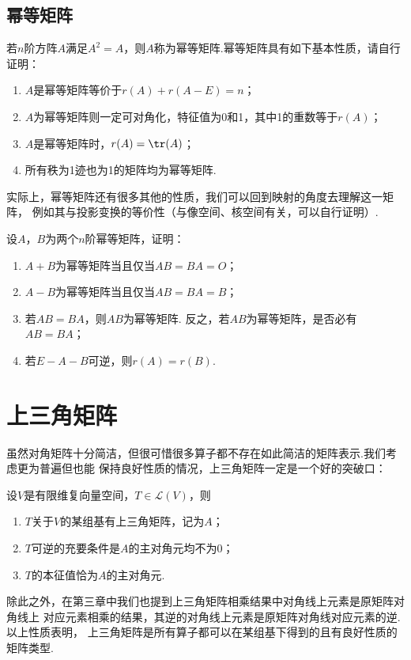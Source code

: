 \subsection{幂等矩阵}
若$n$阶方阵$A$满足$A^2=A$，则$A$称为幂等矩阵.幂等矩阵具有如下基本性质，请自行证明：
\begin{enumerate}
    \item $A$是幂等矩阵等价于$r(A)+r(A-E)=n$；

    \item $A$为幂等矩阵则一定可对角化，特征值为0和1，其中1的重数等于$r(A)$；

    \item $A$是幂等矩阵时，$r(A)=\tr(A)$；

    \item 所有秩为1迹也为1的矩阵均为幂等矩阵.
\end{enumerate}
实际上，幂等矩阵还有很多其他的性质，我们可以回到映射的角度去理解这一矩阵，
例如其与投影变换的等价性（与像空间、核空间有关，可以自行证明）.
\begin{example}
    设$A$，$B$为两个$n$阶幂等矩阵，证明：
    \begin{enumerate}
        \item $A+B$为幂等矩阵当且仅当$AB=BA=O$；

        \item $A-B$为幂等矩阵当且仅当$AB=BA=B$；

        \item 若$AB=BA$，则$AB$为幂等矩阵. 反之，若$AB$为幂等矩阵，是否必有$AB=BA$；

        \item 若$E-A-B$可逆，则$r(A)=r(B)$.
    \end{enumerate}
\end{example}

\section{上三角矩阵}

虽然对角矩阵十分简洁，但很可惜很多算子都不存在如此简洁的矩阵表示.我们考虑更为普遍但也能
保持良好性质的情况，上三角矩阵一定是一个好的突破口：
\begin{theorem}\label{thm:16:上三角矩阵等价条件}
    设$V$是有限维复向量空间，$T\in \mathcal{L}(V)$，则
    \begin{enumerate}
        \item $T$关于$V$的某组基有上三角矩阵，记为$A$；

        \item $T$可逆的充要条件是$A$的主对角元均不为0；

        \item $T$的本征值恰为$A$的主对角元.
    \end{enumerate}
\end{theorem}
除此之外，在第三章中我们也提到上三角矩阵相乘结果中对角线上元素是原矩阵对角线上
对应元素相乘的结果，其逆的对角线上元素是原矩阵对角线对应元素的逆.以上性质表明，
上三角矩阵是所有算子都可以在某组基下得到的且有良好性质的矩阵类型.

